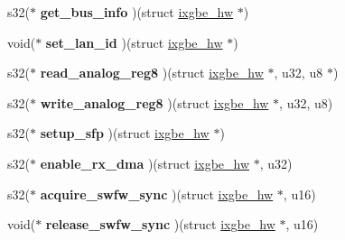\begin{DoxyCompactItemize}
\item 
\hypertarget{structixgbe__mac__operations_a1eda59c5b7af6657cb2547e7442927bf}{
s32($\ast$ {\bfseries get\_\-bus\_\-info} )(struct \hyperlink{structixgbe__hw}{ixgbe\_\-hw} $\ast$)}
\label{structixgbe__mac__operations_a1eda59c5b7af6657cb2547e7442927bf}

\item 
\hypertarget{structixgbe__mac__operations_a04dc6ec2f3e64f7d3ee3b7645f5604f9}{
void($\ast$ {\bfseries set\_\-lan\_\-id} )(struct \hyperlink{structixgbe__hw}{ixgbe\_\-hw} $\ast$)}
\label{structixgbe__mac__operations_a04dc6ec2f3e64f7d3ee3b7645f5604f9}

\item 
\hypertarget{structixgbe__mac__operations_a6bc7dcbb7f73a713c79570f9b9b40fde}{
s32($\ast$ {\bfseries read\_\-analog\_\-reg8} )(struct \hyperlink{structixgbe__hw}{ixgbe\_\-hw} $\ast$, u32, u8 $\ast$)}
\label{structixgbe__mac__operations_a6bc7dcbb7f73a713c79570f9b9b40fde}

\item 
\hypertarget{structixgbe__mac__operations_a9a26db3737e2344bbe984d7fc5c146ce}{
s32($\ast$ {\bfseries write\_\-analog\_\-reg8} )(struct \hyperlink{structixgbe__hw}{ixgbe\_\-hw} $\ast$, u32, u8)}
\label{structixgbe__mac__operations_a9a26db3737e2344bbe984d7fc5c146ce}

\item 
\hypertarget{structixgbe__mac__operations_aceabf53c079b636418757c943f6cf9ec}{
s32($\ast$ {\bfseries setup\_\-sfp} )(struct \hyperlink{structixgbe__hw}{ixgbe\_\-hw} $\ast$)}
\label{structixgbe__mac__operations_aceabf53c079b636418757c943f6cf9ec}

\item 
\hypertarget{structixgbe__mac__operations_aa4fff54e8e820f63829e3670b772bdba}{
s32($\ast$ {\bfseries enable\_\-rx\_\-dma} )(struct \hyperlink{structixgbe__hw}{ixgbe\_\-hw} $\ast$, u32)}
\label{structixgbe__mac__operations_aa4fff54e8e820f63829e3670b772bdba}

\item 
\hypertarget{structixgbe__mac__operations_a7c0a5211cca081957e95592d77fc2d92}{
s32($\ast$ {\bfseries acquire\_\-swfw\_\-sync} )(struct \hyperlink{structixgbe__hw}{ixgbe\_\-hw} $\ast$, u16)}
\label{structixgbe__mac__operations_a7c0a5211cca081957e95592d77fc2d92}

\item 
\hypertarget{structixgbe__mac__operations_a597a31774e76c70c6e88533d62743595}{
void($\ast$ {\bfseries release\_\-swfw\_\-sync} )(struct \hyperlink{structixgbe__hw}{ixgbe\_\-hw} $\ast$, u16)}
\label{structixgbe__mac__operations_a597a31774e76c70c6e88533d62743595}


\end{DoxyCompactItemize}
